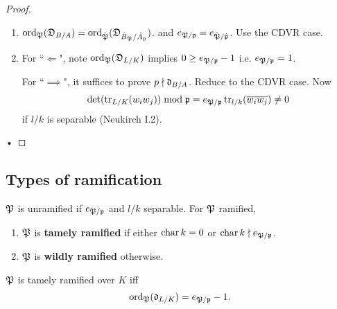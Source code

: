 \begin{proof}
\begin{enumerate}
\item
$\operatorname{ord}_{\mathfrak{P}}(\mathfrak D_{B/A})=\operatorname{ord}_{\hat{\mathfrak{P}}}(\mathfrak D_{\hat B_{\mathfrak{P}}/\hat A_{\mathfrak{p}}})$. and $e_{\mathfrak{P}/\mathfrak{p}}=e_{\hat{\mathfrak{P}}/\hat{\mathfrak{p}}}$. Use the CDVR case.
\item
For ``$\Leftarrow$", note $\operatorname{ord}_{\mathfrak{P}}(\mathfrak D_{L/K})$ implies $0\ge e_{\mathfrak{P}/\mathfrak{p}}-1$ i.e. $e_{\mathfrak{P}/\mathfrak{p}}=1$.

For ``$\implies$", it suffices to prove $p\nmid \mathfrak d_{B/A}$. Reduce to the CDVR case.
Now 
\[\det(\operatorname{tr}_{L/K}(w_iw_j))\bmod{\mathfrak{p}}=e_{\mathfrak{P}/\mathfrak{p}}\operatorname{tr}_{l/k}(\overline{w_iw_j})\ne 0\]
if $l/k$ is separable (Neukirch I.2).
\end{enumerate}•
\end{proof}
\subsection{Types of ramification}
\begin{df}
$\mathfrak{P}$ is unramified if $e_{\mathfrak{P}/\mathfrak{p}}$ and $l/k$ separable. For $\mathfrak{P}$ ramified,
\begin{enumerate}
\item
$\mathfrak{P}$ is \textbf{tamely ramified} if either $\operatorname{char} k=0$ or $\operatorname{char} k\nmid e_{\mathfrak{P}/\mathfrak{p}}$.
\item
$\mathfrak{P}$ is \textbf{wildly ramified} otherwise. 
\end{enumerate}
\end{df}
\begin{thm}
$\mathfrak{P}$ is tamely ramified over $K$ iff
\[
\operatorname{ord}_{\mathfrak{P}}(\mathfrak {\mathfrak d}_{L/K})=e_{\mathfrak{P}/\mathfrak{p}}-1.
\]
\end{thm}
